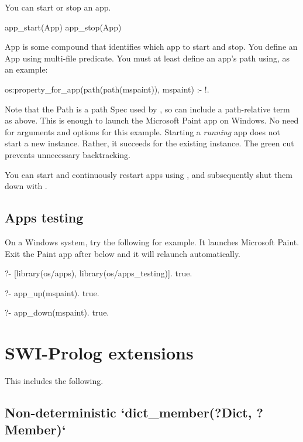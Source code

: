 You can start or stop an app.

\begin{code}
app_start(App)
app_stop(App)
\end{code}

App is some compound that identifies which app to start and stop. You define an
App using  multi-file predicate. You must at least define
an app's path using, as an example:

\begin{code}
os:property_for_app(path(path(mspaint)), mspaint) :- !.
\end{code}

Note that the Path is a path Spec used by , so can include a
path-relative term as above. This is enough to launch the Microsoft Paint app on
Windows. No need for arguments and options for this example. Starting a \textit{running}
app does not start a new instance. Rather, it succeeds for the existing
instance. The green cut prevents unnecessary backtracking.

You can start and continuously restart apps using , and subsequently
shut them down with .

\subsection{Apps testing}

On a Windows system, try the following for example. It launches Microsoft Paint.
Exit the Paint app after  below and it will relaunch automatically.

\begin{code}
?- [library(os/apps), library(os/apps_testing)].
true.

?- app_up(mspaint).
true.

?- app_down(mspaint).
true.
\end{code}

\section{SWI-Prolog extensions}

This includes the following.

\subsection{Non-deterministic `dict_member(?Dict, ?Member)`}

